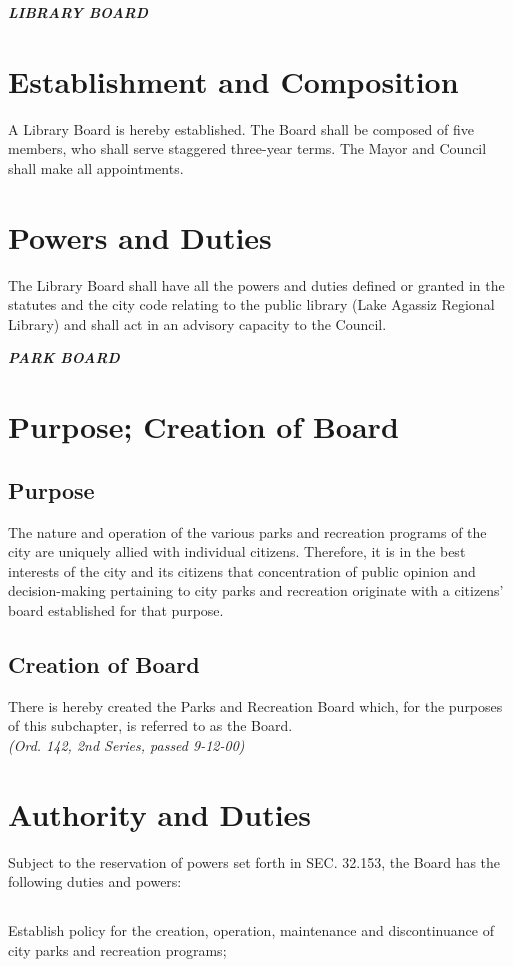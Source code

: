 \centerline{\textbf{\emph{\LARGE{LIBRARY BOARD}}}}
\setcounter{section}{139}
\section{Establishment and Composition}
A Library Board is hereby established. The Board shall be composed of five members, who shall serve staggered three-year terms. The Mayor and Council shall make all appointments.
\section{Powers and Duties}
The Library Board shall have all the powers and duties defined or granted in the statutes and the city code relating to the public library (Lake Agassiz Regional Library) and shall act in an advisory capacity to the Council.\\

\centerline{\textbf{\emph{\LARGE{PARK BOARD}}}}
\setcounter{section}{149}
\section{Purpose; Creation of Board}
\subsection{Purpose}
The nature and operation of the various parks and recreation programs of the city are uniquely allied with individual citizens. Therefore, it is in the best interests of the city and its citizens that concentration of public opinion and decision-making pertaining to city parks and recreation originate with a citizens’ board established for that purpose.
\subsection{Creation of Board}
There is hereby created the Parks and Recreation Board which, for the purposes of this subchapter, is referred to as the Board.\\
\emph{(Ord. 142, 2nd Series, passed 9-12-00)}
\section{Authority and Duties}
Subject to the reservation of powers set forth in SEC. 32.153, the Board has the following duties and powers:
\subsection{}
Establish policy for the creation, operation, maintenance and discontinuance of city parks and recreation programs;
